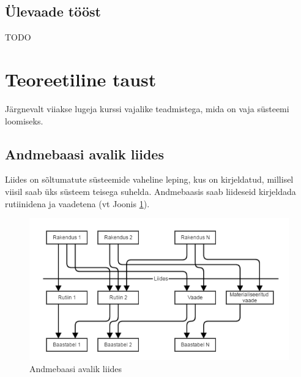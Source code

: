 \documentclass[a4paper,12pt]{article} %
\begin{document}
\subsection{Ülevaade tööst}
TODO
\pagebreak

\section{Teoreetiline taust}
Järgnevalt viiakse lugeja kurssi vajalike teadmistega, mida on vaja süsteemi loomiseks.

\subsection{Andmebaasi avalik liides}
\label{andmebaasi_avalik_liides}
Liides on sõltumatute süsteemide vaheline leping, kus on kirjeldatud, millisel viisil saab üks süsteem teisega suhelda.
Andmebaasis saab liideseid kirjeldada rutiinidena ja vaadetena (vt Joonis \ref{fig_andmebaasi_avalik_liides}).

\begin{figure}[H]
\begin{center}
\includegraphics[bb=0 0 606 330,scale=0.6]{./diagrams/db-interface.png}
\caption{Andmebaasi avalik liides}
\label{fig_andmebaasi_avalik_liides}
\end{center}
\end{figure}
\end{document}
